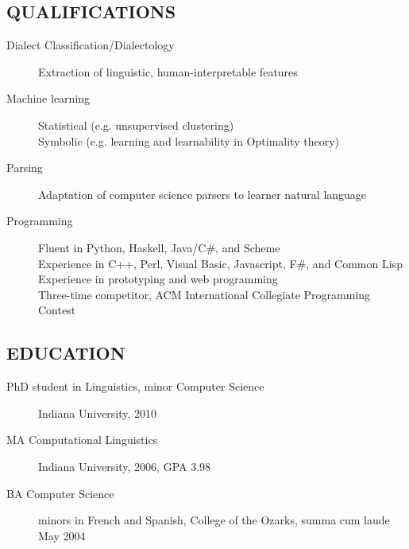 \documentclass{iuthesis}
\begin{document}
\subsection*{QUALIFICATIONS}
\begin{description}
  \item[Dialect Classification/Dialectology] Extraction of
    linguistic, human-interpretable features
  \item[Machine learning] Statistical (e.g. unsupervised clustering) \\
    Symbolic (e.g. learning and learnability in Optimality theory)
  \item[Parsing] Adaptation of computer science parsers to learner
    natural language
  \item[Programming] Fluent in Python, Haskell, Java/C\#, and Scheme \\
    Experience in C++, Perl, Visual Basic, Javascript, F\#, and
    Common Lisp \\
    Experience in prototyping and web programming \\
    Three-time competitor, ACM International Collegiate Programming
    Contest
\end{description}
\subsection*{EDUCATION}
\begin{description}
\item [PhD student in Linguistics, minor Computer Science] Indiana
  University, 2010
\item [MA Computational Linguistics] Indiana University, 2006, GPA 3.98
\item[BA Computer Science] minors in French and Spanish,
		College of the Ozarks, summa cum laude May 2004
\end{description}
\end{document}
